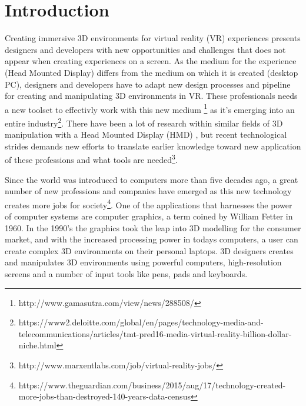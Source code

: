 
\chapter{Introduction}
Creating immersive 3D environments for virtual reality (VR) experiences presents designers and developers with new opportunities and challenges that does not appear when creating experiences on a screen. As the medium for the experience (Head Mounted Display) differs from the medium on which it is created (desktop PC), designers and developers have to adapt new design processes and pipeline for creating and manipulating 3D environments in VR. These professionals needs a new toolset to effectivly work with this new medium \footnote{http://www.gamasutra.com/view/news/288508/} as it's emerging into an entire industry\footnote{https://www2.deloitte.com/global/en/pages/technology-media-and-telecommunications/articles/tmt-pred16-media-virtual-reality-billion-dollar-niche.html}. There have been a lot of research within similar fields of 3D manipulation with a Head Mounted Display (HMD)  \cite{relatedwork:kijimaand1997transition} \cite{relatedwork:bowman1996conceptual} \cite{relatedwork:stoakley1995virtual} \cite{relatedwork:mine1995isaac}, but recent technological strides demands new efforts to translate earlier knowledge toward new application of these professions and what tools are needed\footnote{http://www.marxentlabs.com/job/virtual-reality-jobs/}.

Since the world was introduced to computers more than five decades ago, a great number of new professions and companies have emerged as this new technology creates more jobs for society\footnote{https://www.theguardian.com/business/2015/aug/17/technology-created-more-jobs-than-destroyed-140-years-data-census}. One of the applications that harnesses the power of computer systems are computer graphics, a term coined by William Fetter in 1960\cite{3D_history:graphics_2017}. In the 1990's the graphics took the leap into 3D modelling for the consumer market, and with the increased processing power in todays computers, a user can create complex 3D environments on their personal laptops. 3D designers creates and manipulates 3D environments using powerful computers, high-resolution screens and a number of input tools like pens, pads and keyboards.


